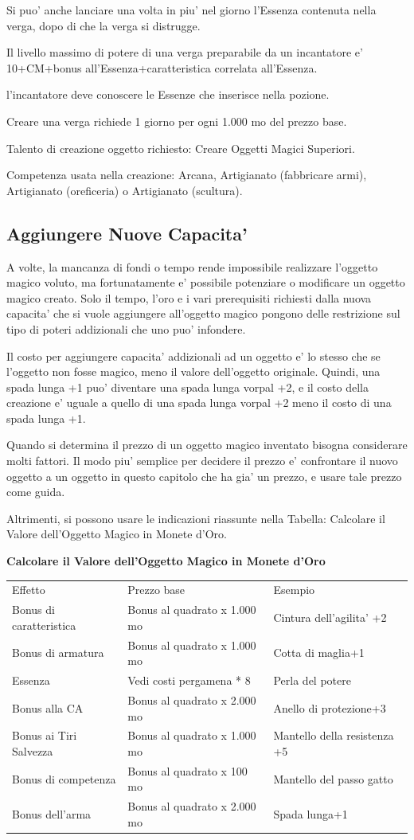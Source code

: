 \documentclass[a4paper,11pt,twoside,openany]{dndbook}
\begin{document}
{Si puo' anche lanciare una volta in piu' nel giorno l'Essenza contenuta nella verga, dopo di che la verga si distrugge.

Il livello massimo di potere di una verga preparabile da un incantatore e' 10+CM+bonus all'Essenza+caratteristica correlata all'Essenza.

l'incantatore deve conoscere le Essenze che inserisce nella pozione.

Creare una verga richiede 1 giorno per ogni 1.000 mo del prezzo base.

Talento di creazione oggetto richiesto: Creare Oggetti Magici Superiori.

Competenza usata nella creazione: Arcana, Artigianato (fabbricare armi), Artigianato (oreficeria) o Artigianato (scultura).

\subsection{Aggiungere Nuove Capacita'}

A volte, la mancanza di fondi o tempo rende impossibile realizzare l'oggetto magico voluto, ma fortunatamente e' possibile potenziare o modificare un oggetto magico creato. Solo il tempo, l'oro e i vari prerequisiti richiesti dalla nuova capacita' che si vuole aggiungere all'oggetto magico pongono delle restrizione sul tipo di poteri addizionali che uno puo' infondere.

Il costo per aggiungere capacita' addizionali ad un oggetto e' lo stesso che se l'oggetto non fosse magico, meno il valore dell'oggetto originale. Quindi, una spada lunga +1 puo' diventare una spada lunga vorpal +2, e il costo della creazione e' uguale a quello di una spada lunga vorpal +2 meno il costo di una spada lunga +1.

Quando si determina il prezzo di un oggetto magico inventato bisogna considerare molti fattori. Il modo piu' semplice per decidere il prezzo e' confrontare il nuovo oggetto a un oggetto in questo capitolo che ha gia' un prezzo, e usare tale prezzo come guida.

Altrimenti, si possono usare le indicazioni riassunte nella Tabella: Calcolare il Valore dell'Oggetto Magico in Monete d'Oro.

\bigskip

\textbf{Calcolare il Valore dell'Oggetto Magico in Monete d'Oro}

\begin{tabular}[c]{@{}lll@{}}
\toprule 
Effetto & Prezzo base & Esempio\tabularnewline
Bonus di caratteristica & Bonus al quadrato x 1.000 mo & Cintura dell'agilita' +2\tabularnewline
Bonus di armatura & Bonus al quadrato x 1.000 mo & Cotta di maglia+1\tabularnewline
Essenza & Vedi costi pergamena {*} 8 & Perla del potere\tabularnewline
Bonus alla CA & Bonus al quadrato x 2.000 mo & Anello di protezione+3\tabularnewline
Bonus ai Tiri Salvezza & Bonus al quadrato x 1.000 mo & Mantello della resistenza +5\tabularnewline
Bonus di competenza & Bonus al quadrato x 100 mo & Mantello del passo gatto\tabularnewline
Bonus dell'arma & Bonus al quadrato x 2.000 mo & Spada lunga+1\tabularnewline
\bottomrule
\end{tabular}

}
\end{document}
